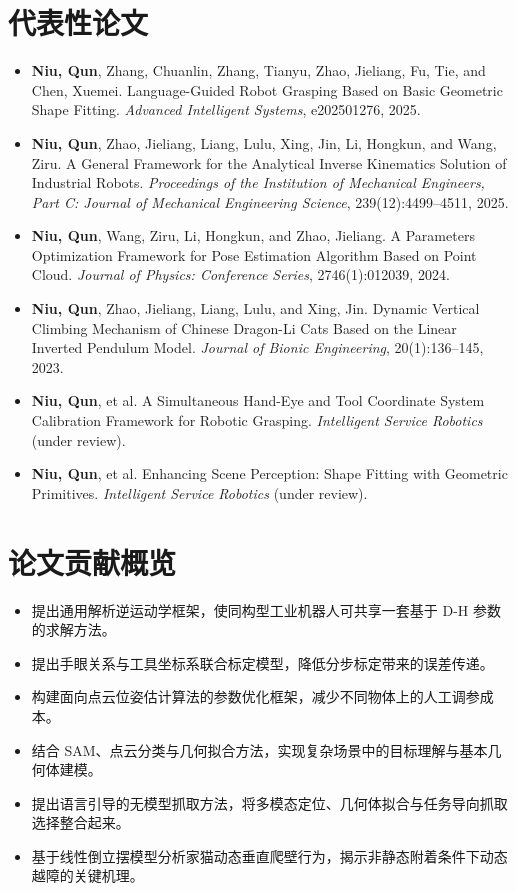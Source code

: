 \documentclass[11pt,a4paper]{article}
\begin{document}
\section*{代表性论文}
\begin{itemize}
	\item \textbf{Niu, Qun}, Zhang, Chuanlin, Zhang, Tianyu, Zhao, Jieliang, Fu, Tie, and Chen, Xuemei. Language-Guided Robot Grasping Based on Basic Geometric Shape Fitting. \textit{Advanced Intelligent Systems}, e202501276, 2025.
	\item \textbf{Niu, Qun}, Zhao, Jieliang, Liang, Lulu, Xing, Jin, Li, Hongkun, and Wang, Ziru. A General Framework for the Analytical Inverse Kinematics Solution of Industrial Robots. \textit{Proceedings of the Institution of Mechanical Engineers, Part C: Journal of Mechanical Engineering Science}, 239(12):4499--4511, 2025.
	\item \textbf{Niu, Qun}, Wang, Ziru, Li, Hongkun, and Zhao, Jieliang. A Parameters Optimization Framework for Pose Estimation Algorithm Based on Point Cloud. \textit{Journal of Physics: Conference Series}, 2746(1):012039, 2024.
	\item \textbf{Niu, Qun}, Zhao, Jieliang, Liang, Lulu, and Xing, Jin. Dynamic Vertical Climbing Mechanism of Chinese Dragon-Li Cats Based on the Linear Inverted Pendulum Model. \textit{Journal of Bionic Engineering}, 20(1):136--145, 2023.
	\item \textbf{Niu, Qun}, et al. A Simultaneous Hand-Eye and Tool Coordinate System Calibration Framework for Robotic Grasping. \textit{Intelligent Service Robotics} (under review).
	\item \textbf{Niu, Qun}, et al. Enhancing Scene Perception: Shape Fitting with Geometric Primitives. \textit{Intelligent Service Robotics} (under review).
\end{itemize}

\section*{论文贡献概览}
\begin{itemize}
	\item 提出通用解析逆运动学框架，使同构型工业机器人可共享一套基于 D-H 参数的求解方法。
	\item 提出手眼关系与工具坐标系联合标定模型，降低分步标定带来的误差传递。
	\item 构建面向点云位姿估计算法的参数优化框架，减少不同物体上的人工调参成本。
	\item 结合 SAM、点云分类与几何拟合方法，实现复杂场景中的目标理解与基本几何体建模。
	\item 提出语言引导的无模型抓取方法，将多模态定位、几何体拟合与任务导向抓取选择整合起来。
	\item 基于线性倒立摆模型分析家猫动态垂直爬壁行为，揭示非静态附着条件下动态越障的关键机理。
\end{itemize}
\end{document}
